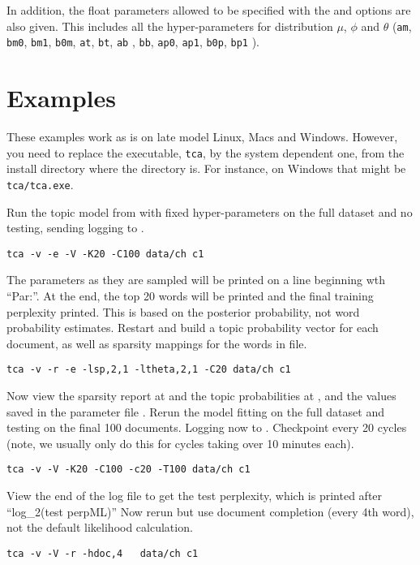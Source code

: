 \documentclass[a4paper,english]{article}
\begin{document}
In addition, the float parameters allowed to be specified with the
 and  options are also given. This includes all the hyper-parameters for distribution $\mu$, $\phi$ and $\theta$ (\texttt{am}, \texttt{bm0}, \texttt{bm1}, \texttt{b0m}, \texttt{at}, \texttt{bt}, \texttt{ab} , \texttt{bb}, \texttt{ap0}, \texttt{ap1}, \texttt{b0p}, \texttt{bp1} ).


\section{Examples}

These examples work as is on late model Linux, Macs and Windows.
However, you need to replace the executable,
\texttt{tca}, by the system dependent one,
from the install directory where the  directory is.
For instance, on Windows that might be \texttt{tca/tca.exe}.

Run the topic model from \citet{dtmpypwl} with fixed hyper-parameters on the full dataset and no testing,
sending logging to .
\begin{verbatim}
tca -v -e -V -K20 -C100 data/ch c1
\end{verbatim}
The parameters as they are sampled will be
printed on a line beginning wth ``Par:''.
At the end, the top 20 words will be printed and the
final training perplexity printed.  This is based on
the posterior probability, not word probability
estimates.
Restart and build a topic probability vector for each document,
as well as sparsity mappings for the words in 
 file.
\begin{verbatim}
tca -v -r -e -lsp,2,1 -ltheta,2,1 -C20 data/ch c1
\end{verbatim} 

Now view the sparsity report at  and
the topic probabilities at ,
and the values saved in the parameter file . 
Rerun the model fitting on the full dataset and testing
on the final 100 documents.  Logging now to .
Checkpoint every 20 cycles
(note, we usually only do this for cycles taking over 10 minutes each).

\begin{verbatim}
tca -v -V -K20 -C100 -c20 -T100 data/ch c1
\end{verbatim}

View the end of the log file to get the test perplexity,
which is printed after ``log\_2(test perpML)''
Now rerun but use document completion (every 4th word), not the default
likelihood calculation.
\begin{verbatim}
tca -v -V -r -hdoc,4   data/ch c1
\end{verbatim}
\end{document}
